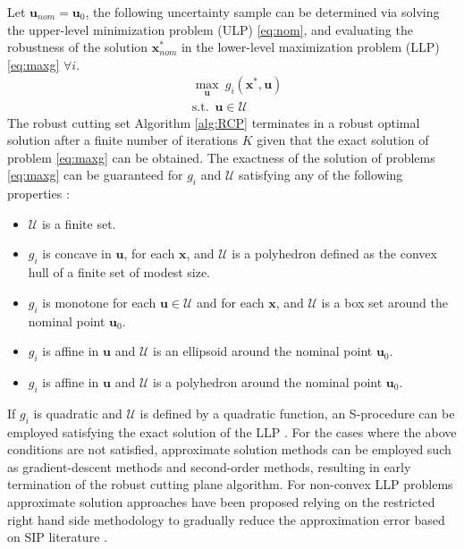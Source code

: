 \documentclass[sn-mathphys-num]{sn-jnl}
\begin{document}
Let $\bm u_{nom}=\bm u_0$, the following uncertainty sample can be determined via solving the upper-level minimization problem (ULP) \ref{eq:nom}, and evaluating the robustness of the solution $\bm x^*_{nom}$ in the lower-level maximization problem (LLP) \eqref{eq:maxg} $\forall i$.
\begin{equation}\tag{$T_i$}\label{eq:maxg}
\begin{aligned}
&\underset{\bm u}{\max}~g_i(\bm x^*, \bm u)\\
&\text{s.t. }\,\bm u\in \mathcal{U}
\end{aligned}
\end{equation}
The robust cutting set Algorithm \ref{alg:RCP} terminates in a robust optimal solution after a finite number of iterations $K$ given that the exact solution of problem \eqref{eq:maxg} can be obtained. The exactness of the solution of problems \eqref{eq:maxg} can be guaranteed for $g_i$ and $\mathcal{U}$ satisfying any of the following properties \citep{Mutapcic2009}:
\begin{itemize}
    \item $\mathcal{U}$ is a finite set.
    \item $g_i$ is concave in $\bm u$, for each $\bm x$, and $\mathcal{U}$ is a polyhedron defined as the convex hull of a finite set of modest size.
    \item $g_i$ is monotone for each $\bm u \in \mathcal{U}$ and for each $\bm x$, and $\mathcal{U}$ is a box set around the nominal point $\bm u_0$.
    \item $g_i$ is affine in $\bm u$ and $\mathcal{U}$ is an ellipsoid around the nominal point $\bm u_0$.
        \item $g_i$ is affine in $\bm u$ and $\mathcal{U}$ is a polyhedron around the nominal point $\bm u_0$.
\end{itemize}

If $g_i$ is quadratic and $\mathcal{U}$ is defined by a quadratic function, an S-procedure can be employed satisfying the exact solution of the LLP \citep{Mutapcic2009}. For the cases where the above conditions are not satisfied, approximate solution methods can be employed such as gradient-descent methods and second-order methods, resulting in early termination of the robust cutting plane algorithm.  For non-convex LLP problems approximate solution approaches have been proposed relying on the restricted right hand side methodology to gradually reduce the approximation error based on SIP literature \cite{Mitsos2009,Mitsos2015,Harwood2021}. 
\end{document}
